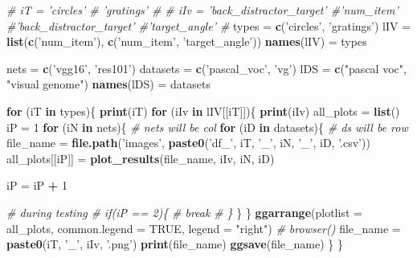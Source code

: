 \documentclass[]{article}
\newenvironment{Shaded}{\begin{snugshade}}{\end{snugshade}}
\newcommand{\KeywordTok}[1]{\textcolor[rgb]{0.13,0.29,0.53}{\textbf{#1}}}
\newcommand{\DataTypeTok}[1]{\textcolor[rgb]{0.13,0.29,0.53}{#1}}
\newcommand{\DecValTok}[1]{\textcolor[rgb]{0.00,0.00,0.81}{#1}}
\newcommand{\StringTok}[1]{\textcolor[rgb]{0.31,0.60,0.02}{#1}}
\newcommand{\CommentTok}[1]{\textcolor[rgb]{0.56,0.35,0.01}{\textit{#1}}}
\newcommand{\OtherTok}[1]{\textcolor[rgb]{0.56,0.35,0.01}{#1}}
\newcommand{\ControlFlowTok}[1]{\textcolor[rgb]{0.13,0.29,0.53}{\textbf{#1}}}
\newcommand{\OperatorTok}[1]{\textcolor[rgb]{0.81,0.36,0.00}{\textbf{#1}}}
\newcommand{\NormalTok}[1]{#1}
\begin{document}
\begin{Shaded}
\begin{Highlighting}[]
\CommentTok{# iT = 'circles' # 'gratings' #}
\CommentTok{# iIv = 'back_distractor_target' #'num_item' #'back_distractor_target' #'target_angle' #}
\NormalTok{types =}\StringTok{ }\KeywordTok{c}\NormalTok{(}\StringTok{'circles'}\NormalTok{, }\StringTok{'gratings'}\NormalTok{)}
\NormalTok{lIV =}\StringTok{ }\KeywordTok{list}\NormalTok{(}\KeywordTok{c}\NormalTok{(}\StringTok{'num_item'}\NormalTok{),}
           \KeywordTok{c}\NormalTok{(}\StringTok{'num_item'}\NormalTok{, }\StringTok{'target_angle'}\NormalTok{))}
\KeywordTok{names}\NormalTok{(lIV) =}\StringTok{ }\NormalTok{types}

\NormalTok{nets =}\StringTok{ }\KeywordTok{c}\NormalTok{(}\StringTok{'vgg16'}\NormalTok{, }\StringTok{'res101'}\NormalTok{)}
\NormalTok{datasets =}\StringTok{ }\KeywordTok{c}\NormalTok{(}\StringTok{'pascal_voc'}\NormalTok{, }\StringTok{'vg'}\NormalTok{)}
\NormalTok{lDS =}\StringTok{ }\KeywordTok{c}\NormalTok{(}\StringTok{"pascal voc"}\NormalTok{, }\StringTok{"visual genome"}\NormalTok{)}
\KeywordTok{names}\NormalTok{(lDS) =}\StringTok{ }\NormalTok{datasets}


\ControlFlowTok{for}\NormalTok{ (iT }\ControlFlowTok{in}\NormalTok{ types)\{}
  \KeywordTok{print}\NormalTok{(iT)}
  \ControlFlowTok{for}\NormalTok{ (iIv }\ControlFlowTok{in}\NormalTok{ lIV[[iT]])\{}
    \KeywordTok{print}\NormalTok{(iIv)}
\NormalTok{    all_plots =}\StringTok{ }\KeywordTok{list}\NormalTok{()}
\NormalTok{    iP =}\StringTok{ }\DecValTok{1}
    \ControlFlowTok{for}\NormalTok{ (iN }\ControlFlowTok{in}\NormalTok{ nets)\{ }\CommentTok{# nets will be col}
      \ControlFlowTok{for}\NormalTok{ (iD }\ControlFlowTok{in}\NormalTok{ datasets)\{ }\CommentTok{# ds will be row}
\NormalTok{        file_name =}\StringTok{ }\KeywordTok{file.path}\NormalTok{(}\StringTok{'images'}\NormalTok{, }\KeywordTok{paste0}\NormalTok{(}\StringTok{'df_'}\NormalTok{, iT, }\StringTok{'_'}\NormalTok{, iN, }\StringTok{'_'}\NormalTok{, iD, }\StringTok{'.csv'}\NormalTok{))}
\NormalTok{        all_plots[[iP]] =}\StringTok{ }\KeywordTok{plot_results}\NormalTok{(file_name, iIv, iN, iD)}

\NormalTok{        iP =}\StringTok{ }\NormalTok{iP }\OperatorTok{+}\StringTok{ }\DecValTok{1}

        \CommentTok{# during testing}
        \CommentTok{# if(iP == 2)\{}
        \CommentTok{#   break}
        \CommentTok{# \}}
\NormalTok{      \}}
\NormalTok{    \}}
    \KeywordTok{ggarrange}\NormalTok{(}\DataTypeTok{plotlist =}\NormalTok{ all_plots, }\DataTypeTok{common.legend =} \OtherTok{TRUE}\NormalTok{, }\DataTypeTok{legend =} \StringTok{"right"}\NormalTok{)}
    \CommentTok{# browser()}
\NormalTok{    file_name =}\StringTok{ }\KeywordTok{paste0}\NormalTok{(iT, }\StringTok{'_'}\NormalTok{, iIv, }\StringTok{'.png'}\NormalTok{)}
    \KeywordTok{print}\NormalTok{(file_name)}
    \KeywordTok{ggsave}\NormalTok{(file_name)}
\NormalTok{  \}}
\NormalTok{\}}
\end{Highlighting}
\end{Shaded}
\end{document}
